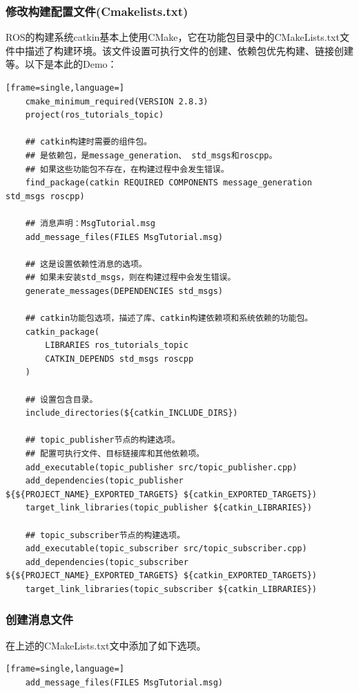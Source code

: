 \documentclass[geye,green,kindle,cn]{elegantnote}
\begin{document}
\subsubsection{修改构建配置文件(Cmakelists.txt)}
ROS的构建系统catkin基本上使用CMake，它在功能包目录中的CMakeLists.txt文件中描述了构建环境。该文件设置可执行文件的创建、依赖包优先构建、链接创建等。以下是本此的Demo：
\begin{lstlisting}[frame=single,language=]
    cmake_minimum_required(VERSION 2.8.3) 
    project(ros_tutorials_topic) 
    
    ## catkin构建时需要的组件包。 
    ## 是依赖包，是message_generation、 std_msgs和roscpp。 
    ## 如果这些功能包不存在，在构建过程中会发生错误。 
    find_package(catkin REQUIRED COMPONENTS message_generation std_msgs roscpp) 
    
    ## 消息声明：MsgTutorial.msg 
    add_message_files(FILES MsgTutorial.msg) 
    
    ## 这是设置依赖性消息的选项。 
    ## 如果未安装std_msgs，则在构建过程中会发生错误。 
    generate_messages(DEPENDENCIES std_msgs) 
    
    ## catkin功能包选项，描述了库、catkin构建依赖项和系统依赖的功能包。 
    catkin_package(      
        LIBRARIES ros_tutorials_topic    
        CATKIN_DEPENDS std_msgs roscpp 
    )
    
    ## 设置包含目录。 
    include_directories(${catkin_INCLUDE_DIRS}) 
    
    ## topic_publisher节点的构建选项。 
    ## 配置可执行文件、目标链接库和其他依赖项。 
    add_executable(topic_publisher src/topic_publisher.cpp) 
    add_dependencies(topic_publisher ${${PROJECT_NAME}_EXPORTED_TARGETS} ${catkin_EXPORTED_TARGETS}) 
    target_link_libraries(topic_publisher ${catkin_LIBRARIES}) 
    
    ## topic_subscriber节点的构建选项。 
    add_executable(topic_subscriber src/topic_subscriber.cpp) 
    add_dependencies(topic_subscriber ${${PROJECT_NAME}_EXPORTED_TARGETS} ${catkin_EXPORTED_TARGETS}) 
    target_link_libraries(topic_subscriber ${catkin_LIBRARIES})
\end{lstlisting}
\subsubsection{创建消息文件}
在上述的CMakeLists.txt文中添加了如下选项。 
\begin{lstlisting}[frame=single,language=]
    add_message_files(FILES MsgTutorial.msg)
\end{lstlisting}
\end{document}
